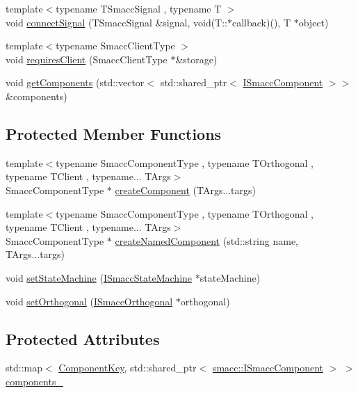\begin{DoxyCompactItemize}
\item 
{\footnotesize template$<$typename T\+Smacc\+Signal , typename T $>$ }\\void \hyperlink{classsmacc_1_1ISmaccClient_addce4ebcdebc5a7a3f80c0980862575d}{connect\+Signal} (T\+Smacc\+Signal \&signal, void(T\+::$\ast$callback)(), T $\ast$object)
\item 
{\footnotesize template$<$typename Smacc\+Client\+Type $>$ }\\void \hyperlink{classsmacc_1_1ISmaccClient_a7a9990a2f3e35d547671188d69fee520}{requires\+Client} (Smacc\+Client\+Type $\ast$\&storage)
\item 
void \hyperlink{classsmacc_1_1ISmaccClient_ac6db21c1ec7072178e9f7c721908e07d}{get\+Components} (std\+::vector$<$ std\+::shared\+\_\+ptr$<$ \hyperlink{classsmacc_1_1ISmaccComponent}{I\+Smacc\+Component} $>$$>$ \&components)
\end{DoxyCompactItemize}
\subsection*{Protected Member Functions}
\begin{DoxyCompactItemize}
\item 
{\footnotesize template$<$typename Smacc\+Component\+Type , typename T\+Orthogonal , typename T\+Client , typename... T\+Args$>$ }\\Smacc\+Component\+Type $\ast$ \hyperlink{classsmacc_1_1ISmaccClient_ad7eee3b9f331a295508ba0514adf5ad0}{create\+Component} (T\+Args...\+targs)
\item 
{\footnotesize template$<$typename Smacc\+Component\+Type , typename T\+Orthogonal , typename T\+Client , typename... T\+Args$>$ }\\Smacc\+Component\+Type $\ast$ \hyperlink{classsmacc_1_1ISmaccClient_af85a9d2af6d5465d3a59162548dc0e10}{create\+Named\+Component} (std\+::string name, T\+Args...\+targs)
\item 
void \hyperlink{classsmacc_1_1ISmaccClient_a28fd6ca2bcf9c5e57f3cc16fb0a076d3}{set\+State\+Machine} (\hyperlink{classsmacc_1_1ISmaccStateMachine}{I\+Smacc\+State\+Machine} $\ast$state\+Machine)
\item 
void \hyperlink{classsmacc_1_1ISmaccClient_a40330788a976dc08e2f726d210564ec4}{set\+Orthogonal} (\hyperlink{classsmacc_1_1ISmaccOrthogonal}{I\+Smacc\+Orthogonal} $\ast$orthogonal)
\end{DoxyCompactItemize}
\subsection*{Protected Attributes}
\begin{DoxyCompactItemize}
\item 
std\+::map$<$ \hyperlink{structsmacc_1_1ComponentKey}{Component\+Key}, std\+::shared\+\_\+ptr$<$ \hyperlink{classsmacc_1_1ISmaccComponent}{smacc\+::\+I\+Smacc\+Component} $>$ $>$ \hyperlink{classsmacc_1_1ISmaccClient_a9e670e9071bb549dbeb08985d0114afe}{components\+\_\+}
\end{DoxyCompactItemize}
